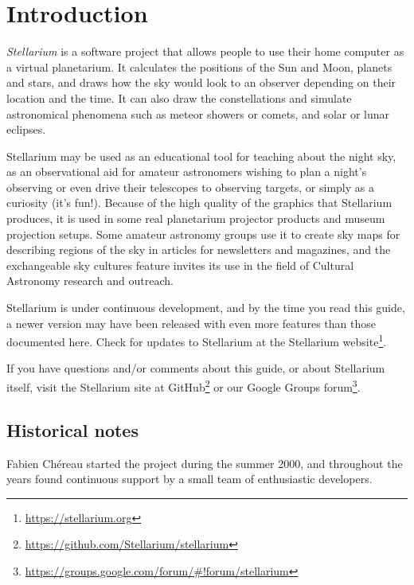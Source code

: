 

\chapter{Introduction}
\label{ch:Introduction}

\emph{Stellarium} is a software project that allows people to use their
home computer as a virtual planetarium. It calculates the positions of
the Sun and Moon, planets and stars, and draws how the sky would look to
an observer depending on their location and the time. It can also draw
the constellations and simulate astronomical phenomena such as meteor
showers or comets, and solar or lunar eclipses.

Stellarium may be used as an educational tool for teaching about the
night sky, as an observational aid for amateur astronomers wishing to
plan a night's observing or even drive their telescopes to observing
targets, or simply as a curiosity (it's fun!). Because of the high
quality of the graphics that Stellarium produces, it is used in some
real planetarium projector products and museum projection setups. Some
amateur astronomy groups use it to create sky maps for describing
regions of the sky in articles for newsletters and magazines, and the
exchangeable sky cultures feature invites its use in the field of
Cultural Astronomy research and outreach.

Stellarium is under continuous development, and by the time you read
this guide, a newer version may have been released with even more
features than those documented here. Check for updates to Stellarium at
the Stellarium website\footnote{\url{https://stellarium.org}}.

If you have questions and/or comments about this guide, or about
Stellarium itself, visit the Stellarium site at
GitHub\footnote{\url{https://github.com/Stellarium/stellarium}} or our
Google Groups
forum\footnote{\url{https://groups.google.com/forum/#!forum/stellarium}}.


\section{Historical notes}
\label{sec:Introduction:HistoricalNotes}

Fabien Ch\'ereau started the project during the summer 2000, and throughout
the years found continuous support by a small team of enthusiastic developers.


